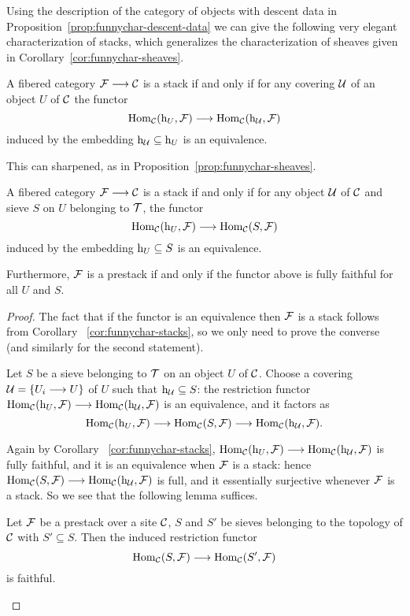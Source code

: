 \begin{4   STACKS}
\begin{4.1 Descent of objects of fibcats}
Using the description of the category of objects with descent data in Proposition~\ref{prop:funnychar-descent-data} we can give the following very elegant characterization of stacks, which generalizes the characterization of sheaves given in Corollary~\ref{cor:funnychar-sheaves}.

\begin{corollary}\label{cor:funnychar-stacks}
A fibered category $\cF \arr \cC$ is a stack if and only if for any covering $\mathcal{U}$ of an object $U$ of $\mathcal{C}$ the functor
   \[
   \hom_\cC(\h_{U},\cF)
   \arr
   \hom_\cC(\h_{\cU},\cF)
   \]
induced by the embedding $\mathrm{h}_{\mathcal{U}} \subseteq \mathrm{h}_{U}$ is an equivalence.
\end{corollary}

This can sharpened, as in Proposition~\ref{prop:funnychar-sheaves}.

\begin{proposition}\label{prop:funnychar-stacks}
A fibered category $\cF \arr \cC$ is a stack if and only if for any object $\mathcal{U}$ of $\mathcal{C}$ and sieve $S$ on $U$ belonging to $\mathcal{T}$, the functor
   \[
   \hom_\cC(\h_{U},\cF)
   \arr
   \hom_\cC(S,\cF)
   \]
induced by the embedding $\mathrm{h}_{U} \subseteq S$ is an equivalence.

Furthermore, $\mathcal{F}$ is a prestack if and only if the functor above is fully faithful for all $U$ and $S$.
\end{proposition}

\begin{proof}
The fact that if the functor is an equivalence then $\mathcal{F}$ is a stack follows from Corollary ~\ref{cor:funnychar-stacks}, so we only need to prove the converse (and similarly for the second statement).

Let $S$ be a sieve belonging to $\mathcal{T}$ on an object $U$ of $\mathcal{C}$. Choose a covering $\mathcal{U} = \{U_{i} \longrightarrow U\}$ of $U$ such that $\mathrm{h}_{\mathcal{U}} \subseteq S$: the restriction functor $\hom_\cC(\h_{U},\cF) \arr \hom_\cC(\h_{\cU},\cF)$ is an equivalence, and it factors as
   \[
   \hom_\cC(\h_{U},\cF) \arr \hom_\cC(S,\cF) \arr \hom_\cC(\h_{\cU},\cF).
   \]

Again by Corollary ~\ref{cor:funnychar-stacks}, $\hom_\cC(\h_{U},\cF) \arr \hom_\cC(\h_{\cU},\cF)$ is fully faithful, and it is an equivalence when $\mathcal{F}$ is a stack: hence $ \hom_\cC(S,\cF) \arr \hom_\cC(\h_{\cU},\cF)$ is full, and it essentially surjective whenever $\mathcal{F}$ is a stack. So we see that the following lemma suffices.

\begin{lemma}\label{lem:prestack->faithful}
Let $\mathcal{F}$ be a prestack over a site $\mathcal{C}$, $S$ and $S'$ be sieves belonging to the topology of $\mathcal{C}$ with $S' \subseteq S$. Then the induced restriction functor
   \[
   \hom_\cC(S,\cF) \arr \hom_\cC(S',\cF)
   \]
is faithful.
\end{lemma}


\end{proof}
\end{4.1 Descent of objects of fibcats}
\end{4   STACKS}
